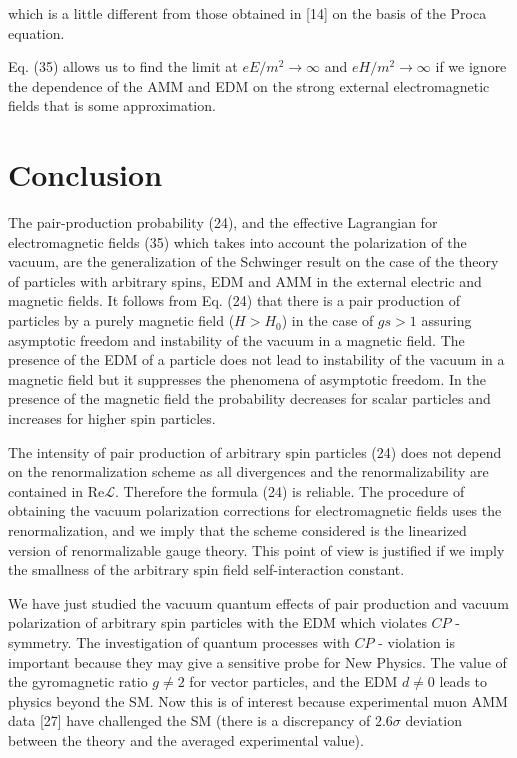 \documentclass[a4paper,12pt]{article}
\begin{document}
which is a little different from those obtained in [14] on the basis of the
Proca equation.

Eq. (35) allows us to find the limit at $eE/m^2\rightarrow \infty $ and
$eH/m^2\rightarrow \infty $ if we ignore the dependence of the AMM and EDM on
the strong external electromagnetic fields that is some approximation.

\section{Conclusion}

The pair-production probability (24), and the effective Lagrangian for
electromagnetic fields (35) which takes into account the polarization of the
vacuum, are the generalization of the Schwinger result on the case of the
theory of particles with arbitrary spins, EDM and AMM in the external
electric and magnetic fields. It follows from Eq. (24) that there is a pair
production of particles by a purely magnetic field ($H>H_0$) in the case of
$gs>1$ assuring asymptotic freedom and instability of the vacuum in a
magnetic field. The presence of the EDM of a particle does not lead to
instability of the vacuum in a magnetic field but it suppresses the
phenomena of asymptotic freedom. In the presence of the magnetic field the
probability decreases for scalar particles and increases for higher spin
particles.

The intensity of pair production of arbitrary spin particles (24) does not
depend on the renormalization scheme as all divergences and the
renormalizability are contained in Re$\mathcal{L}$. Therefore the formula
(24) is reliable. The procedure of obtaining the vacuum polarization
corrections for electromagnetic fields uses the renormalization, and we
imply that the scheme considered is the linearized version of renormalizable
gauge theory. This point of view is justified if we imply the smallness of
the arbitrary spin field self-interaction constant.

We have just studied the vacuum quantum effects of pair production and
vacuum polarization of arbitrary spin particles with the EDM which violates
$CP$ - symmetry. The investigation of quantum processes with $CP$ - violation
is important because they may give a sensitive probe for New Physics. The
value of the gyromagnetic ratio $g\neq 2$ for vector particles, and the EDM
$d \neq 0$ leads to physics beyond the SM. Now this is of interest because
experimental muon AMM data [27] have challenged the SM (there is a
discrepancy of $2.6\sigma $ deviation between the theory and the averaged
experimental value).
\end{document}
